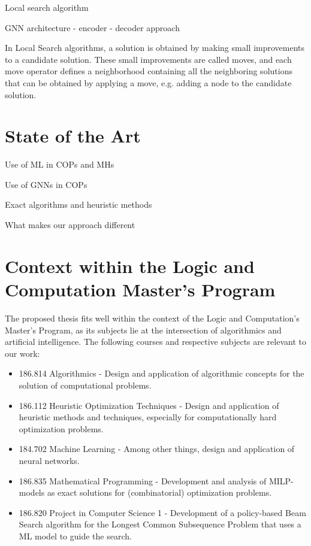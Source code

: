 \documentclass [11pt]{article}
\begin{document}
Local search algorithm

GNN architecture - encoder - decoder approach

In Local Search algorithms, a solution is obtained by making small improvements to a candidate solution. These small improvements are called moves, and each move operator defines a neighborhood containing all the neighboring solutions that can be obtained by applying a move, e.g. adding a node to the candidate solution. 

\section{State of the Art}

Use of ML in COPs and MHs

Use of GNNs in COPs

Exact algorithms and heuristic methods 

What makes our approach different

\section{Context within the Logic and Computation Master's Program}

The proposed thesis fits well within the context of the Logic and Computation's Master's Program, as its subjects lie at the intersection of algorithmics and artificial intelligence. The following courses and respective subjects are relevant to our work:
\begin{itemize}
	\item 186.814 Algorithmics - Design and application of algorithmic concepts for the solution of computational problems. 
	\item 186.112 Heuristic Optimization Techniques - Design and application of heuristic methods and techniques, especially for computationally hard optimization problems.
	\item 184.702 Machine Learning - Among other things, design and application of neural networks.
	\item 186.835 Mathematical Programming - Development and analysis of MILP-models as exact solutions for (combinatorial) optimization problems.
	\item 186.820 Project in Computer Science 1 - Development of a policy-based Beam Search algorithm for the Longest Common Subsequence Problem that uses a ML model to guide the search. 
\end{itemize}

 

\end{document}
